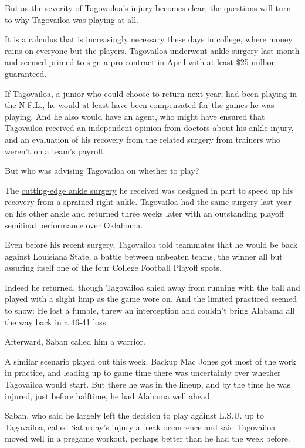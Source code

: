 But as the severity of Tagovailoa's injury becomes clear, the questions
will turn to why Tagovailoa was playing at all.

It is a calculus that is increasingly necessary these days in college,
where money rains on everyone but the players. Tagovailoa underwent
ankle surgery last month and seemed primed to sign a pro contract in
April with at least \$25 million guaranteed.

If Tagovailoa, a junior who could choose to return next year, had been
playing in the N.F.L., he would at least have been compensated for the
games he was playing. And he also would have an agent, who might have
ensured that Tagovailoa received an independent opinion from doctors
about his ankle injury, and an evaluation of his recovery from the
related surgery from trainers who weren't on a team's payroll.

But who was advising Tagovailoa on whether to play?

The
\href{https://www.nytimes3xbfgragh.onion/2019/11/09/sports/ncaafootball/tua-tagovailoa-alabama-lsu.html}{cutting-edge
ankle surgery} he received was designed in part to speed up his recovery
from a sprained right ankle. Tagovailoa had the same surgery last year
on his other ankle and returned three weeks later with an outstanding
playoff semifinal performance over Oklahoma.

Even before his recent surgery, Tagovailoa told teammates that he would
be back against Louisiana State, a battle between unbeaten teams, the
winner all but assuring itself one of the four College Football Playoff
spots.

Indeed he returned, though Tagovailoa shied away from running with the
ball and played with a slight limp as the game wore on. And the limited
practiced seemed to show: He lost a fumble, threw an interception and
couldn't bring Alabama all the way back in a 46-41 loss.

Afterward, Saban called him a warrior.

A similar scenario played out this week. Backup Mac Jones got most of
the work in practice, and leading up to game time there was uncertainty
over whether Tagovailoa would start. But there he was in the lineup, and
by the time he was injured, just before halftime, he had Alabama well
ahead.

Saban, who said he largely left the decision to play against L.S.U. up
to Tagovailoa, called Saturday's injury a freak occurrence and said
Tagovailoa moved well in a pregame workout, perhaps better than he had
the week before.

